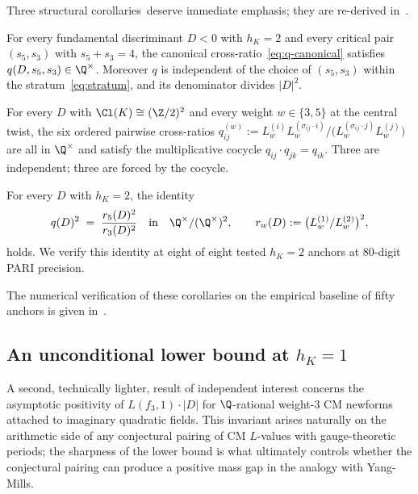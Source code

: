 Three structural corollaries~deserve immediate emphasis; they are
re-derived in~.

\begin{corollary}[Cross-weight at $h_K = 2$]\label{cor:q-rational-intro}
For every fundamental discriminant $D < 0$ with $h_K = 2$ and
every critical pair $(s_5, s_3)$ with $s_5 + s_3 = 4$, the
canonical cross-ratio~\eqref{eq:q-canonical} satisfies
$q(D, s_5, s_3) \in \Q^\times$. Moreover $q$ is independent of the
choice of $(s_5, s_3)$ within the stratum~\eqref{eq:stratum}, and
its denominator divides $|D|^2$.
\end{corollary}

\begin{corollary}[Klein quartet at $h_K = 4$]\label{cor:klein-intro}
For every $D$ with $\Cl(K) \cong (\Z/2)^2$ and every weight $w \in
\{3, 5\}$ at the central twist, the six ordered pairwise
cross-ratios
$q_{ij}^{(w)} := L_w^{(i)} L_w^{(\sigma_{ij} \cdot i)}\bigl/
\bigl(L_w^{(\sigma_{ij} \cdot j)} L_w^{(j)}\bigr)$ are all in
$\Q^\times$ and satisfy the multiplicative cocycle
$q_{ij} \cdot q_{jk} = q_{ik}$. Three are independent; three are
forced by the cocycle.
\end{corollary}

\begin{corollary}[Squared-ratio identity at $h_K = 2$]
\label{cor:squared-identity-intro}
For every $D$ with $h_K = 2$, the identity
\[
q(D)^2 \;=\; \frac{r_5(D)^2}{r_3(D)^2}
\quad\text{in}\quad \Q^\times/(\Q^\times)^2,
\qquad r_w(D) := \bigl(L_w^{(1)}/L_w^{(2)}\bigr)^2,
\]
holds. We verify this identity at eight of eight tested $h_K = 2$
anchors at $80$-digit PARI precision.
\end{corollary}

The numerical verification of these corollaries on the empirical
baseline of fifty anchors is given in~.

\subsection{An unconditional lower bound at $h_K = 1$}
\label{ss:T2-statement}

A second, technically lighter, result of independent interest
concerns the asymptotic positivity of $L(f_3, 1) \cdot |D|$ for
$\Q$-rational weight-$3$ CM newforms attached to imaginary
quadratic fields. This invariant arises naturally on the
arithmetic side of any conjectural pairing of CM $L$-values with
gauge-theoretic periods; the sharpness of the lower bound is what
ultimately controls whether the conjectural pairing can produce a
positive mass gap in the analogy with Yang-Mills.

